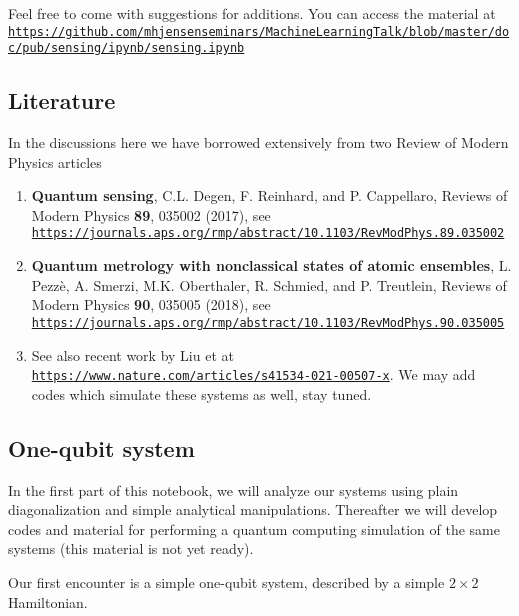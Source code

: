 \documentclass[%
oneside,                 %
final,                   %
10pt]{article}
\begin{document}
\noindent
Feel free to come with suggestions for additions. You can access the material at \href{{https://github.com/mhjensenseminars/MachineLearningTalk/blob/master/doc/pub/sensing/ipynb/sensing.ipynb}}{\nolinkurl{https://github.com/mhjensenseminars/MachineLearningTalk/blob/master/doc/pub/sensing/ipynb/sensing.ipynb}}

\subsection{Literature}

In the discussions here we have borrowed extensively from two Review of Modern Physics
articles
\begin{enumerate}
\item \textbf{Quantum sensing}, C.L. Degen, F. Reinhard, and P. Cappellaro, Reviews of  Modern  Physics \textbf{89}, 035002 (2017), see \href{{https://journals.aps.org/rmp/abstract/10.1103/RevModPhys.89.035002}}{\nolinkurl{https://journals.aps.org/rmp/abstract/10.1103/RevModPhys.89.035002}}

\item \textbf{Quantum metrology with nonclassical states of atomic ensembles}, L. Pezzè, A. Smerzi, M.K. Oberthaler, R. Schmied, and P. Treutlein, Reviews of  Modern  Physics \textbf{90}, 035005 (2018), see \href{{https://journals.aps.org/rmp/abstract/10.1103/RevModPhys.90.035005}}{\nolinkurl{https://journals.aps.org/rmp/abstract/10.1103/RevModPhys.90.035005}}

\item See also recent work by Liu et at \href{{https://www.nature.com/articles/s41534-021-00507-x}}{\nolinkurl{https://www.nature.com/articles/s41534-021-00507-x}}. We may add codes which simulate these systems as well, stay tuned.
\end{enumerate}

\noindent
\subsection{One-qubit system}

In the first part of this notebook, we will analyze our systems using
plain diagonalization and simple analytical manipulations.  Thereafter
we will develop codes and material for performing a quantum computing
simulation of the same systems (this material is not yet ready).

Our first encounter is a simple one-qubit system, described by a simple $2\times 2$ Hamiltonian.
\end{document}
